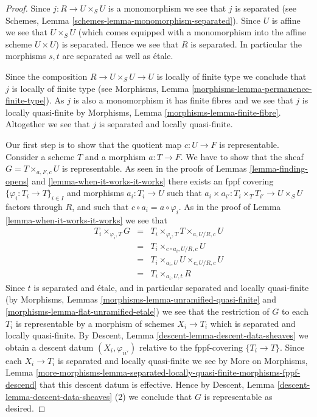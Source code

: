 \documentclass[10pt,a4paper]{amsart}
\theoremstyle{plain}
\theoremstyle{definition}
\theoremstyle{remark}
\numberwithin{equation}{subsection}
\begin{document}
\begin{proof}
Since $j : R \to U \times_S U$ is a monomorphism we see that $j$ is separated
(see Schemes, Lemma \ref{schemes-lemma-monomorphism-separated}).
Since $U$ is affine we see that $U \times_S U$
(which comes equipped with a monomorphism into the affine scheme
$U \times U$) is separated. Hence we see that $R$ is separated.
In particular the morphisms $s, t$ are separated as well as \'etale.

\medskip\noindent
Since the composition $R \to U \times_S U \to U$ is
locally of finite type we conclude that
$j$ is locally of finite type (see
Morphisms, Lemma \ref{morphisms-lemma-permanence-finite-type}).
As $j$ is also a monomorphism it has finite fibres and
we see that $j$ is locally quasi-finite by
Morphisms, Lemma \ref{morphisms-lemma-finite-fibre}.
Altogether we see that $j$ is separated and locally quasi-finite.

\medskip\noindent
Our first step is to show that the quotient map
$c : U \to F$ is representable.
Consider a scheme $T$ and a morphism $a : T \to F$.
We have to show that the sheaf $G = T \times_{a, F, c} U$
is representable.
As seen in the proofs of Lemmas \ref{lemma-finding-opens} and
\ref{lemma-when-it-works-it-works} there exists an fppf covering
$\{\varphi_i : T_i \to T\}_{i \in I}$ and morphisms $a_i : T_i \to U$
such that $a_i \times a_{i'} : T_i \times_T T_{i'} \to U \times_S U$
factors through $R$, and such that $c \circ a_i = a \circ \varphi_i$.
As in the proof of Lemma \ref{lemma-when-it-works-it-works} we see that
\begin{eqnarray*}
T_i \times_{\varphi_i, T} G & = &
T_i \times_{\varphi_i, T} T \times_{a, U/R, c} U \\
& = & T_i \times_{c \circ a_i, U/R, c} U \\
& = & T_i \times_{a_i, U} U \times_{c, U/R, c} U \\
& = & T_i \times_{a_i, U, t} R
\end{eqnarray*}
Since $t$ is separated and \'etale, and in particular
separated and locally quasi-finite (by Morphisms, Lemmas
\ref{morphisms-lemma-unramified-quasi-finite} and
\ref{morphisms-lemma-flat-unramified-etale})
we see that the restriction
of $G$ to each $T_i$ is representable by a morphism of schemes
$X_i \to T_i$ which is separated and locally quasi-finite. By
Descent, Lemma \ref{descent-lemma-descent-data-sheaves}
we obtain a descent datum $(X_i, \varphi_{ii'})$ relative
to the fppf-covering $\{T_i \to T\}$. Since each
$X_i \to T_i$ is separated and locally quasi-finite we see by
More on Morphisms, Lemma
\ref{more-morphisms-lemma-separated-locally-quasi-finite-morphisms-fppf-descend}
that this descent datum is effective.
Hence by
Descent, Lemma \ref{descent-lemma-descent-data-sheaves} (2)
we conclude that $G$ is representable as desired.


\end{proof}
\end{document}

